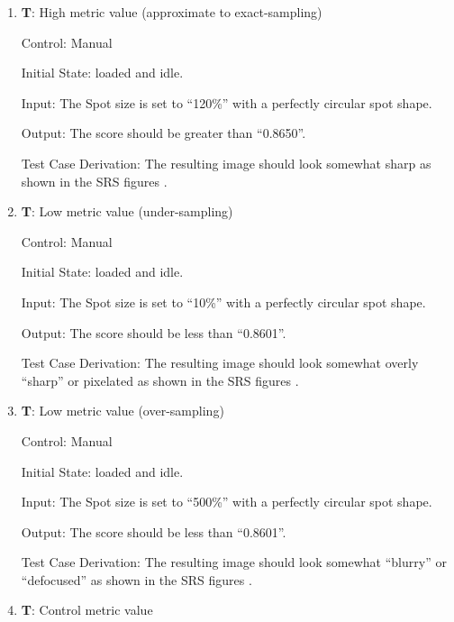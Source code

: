 \documentclass[12pt, titlepage]{article}
\newcounter{testnum} %
\begin{document}
\begin{enumerate}

  \item{\textbf{T\thetestnum \label{T_manualMetricHigh}}: High metric value (approximate to exact-sampling)\\}

    Control: Manual
              
    Initial State: \progname{} loaded and idle.
              
    Input: The Spot size is set to ``120\%'' with a perfectly circular spot shape.
              
    Output: The score should be greater than ``0.8650''.

    Test Case Derivation: The resulting image should look somewhat sharp as shown in the SRS figures \citep{SRS}.
					
  \item{\textbf{T\thetestnum \label{T_manualMetricLow}}: Low metric value (under-sampling)\\}

  Control: Manual
              
  Initial State: \progname{} loaded and idle.
            
  Input: The Spot size is set to ``10\%'' with a perfectly circular spot shape.
            
  Output: The score should be less than ``0.8601''.

  Test Case Derivation: The resulting image should look somewhat overly ``sharp'' or pixelated as shown in the SRS figures \citep{SRS}.
  					
  \item{\textbf{T\thetestnum \label{T_manualMetricLow2}}: Low metric value (over-sampling)\\}

  Control: Manual
              
  Initial State: \progname{} loaded and idle.
            
  Input: The Spot size is set to ``500\%'' with a perfectly circular spot shape.
            
  Output: The score should be less than ``0.8601''.

  Test Case Derivation: The resulting image should look somewhat ``blurry'' or ``defocused'' as shown in the SRS figures \citep{SRS}.
  					
  \item{\textbf{T\thetestnum \label{T_manualMetricControl}}: Control metric value\\}


\end{enumerate}
\end{document}
